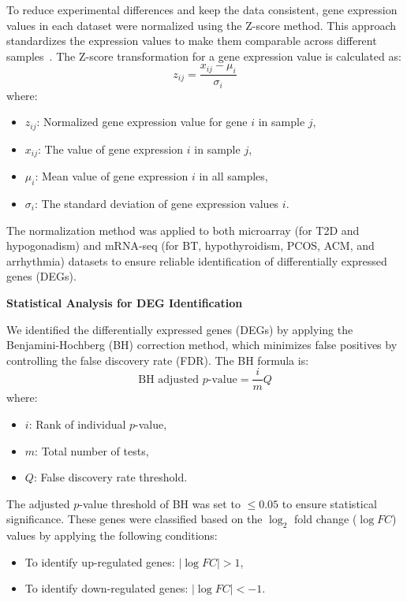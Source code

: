 To reduce experimental differences and keep the data consistent, gene expression values in each dataset were normalized using the Z-score method. This approach standardizes the expression values to make them comparable across different samples~\cite{b15}. The Z-score transformation for a gene expression value is calculated as:
\begin{equation}
z_{ij} = \frac{x_{ij} - \mu_i}{\sigma_i}
\label{eq:zscore}
\end{equation}
where:
\begin{itemize}
    \item $z_{ij}$: Normalized gene expression value for gene $i$ in sample $j$,
    \item $x_{ij}$: The value of gene expression $i$ in sample $j$,
    \item $\mu_i$: Mean value of gene expression $i$ in all samples,
    \item $\sigma_i$: The standard deviation of gene expression values $i$.
\end{itemize}

The normalization method was applied to both microarray (for T2D and hypogonadism) and mRNA-seq (for BT, hypothyroidism, PCOS, ACM, and arrhythmia) datasets to ensure reliable identification of differentially expressed genes (DEGs).

\vspace{8mm}
\textbf{Statistical Analysis for DEG Identification}
\vspace{5mm}

We identified the differentially expressed genes (DEGs) by applying the Benjamini-Hochberg (BH) correction method, which minimizes false positives by controlling the false discovery rate (FDR). The BH formula is:
\begin{equation}
\text{BH adjusted } p\text{-value} = \frac{i}{m} Q
\label{eq:bh_formula}
\end{equation}
where:
\begin{itemize}
    \item $i$: Rank of individual $p$-value,
    \item $m$: Total number of tests,
    \item $Q$: False discovery rate threshold.
\end{itemize}

The adjusted $p$-value threshold of BH was set to $\leq 0.05$ to ensure statistical significance. These genes were classified based on the $\log_2$ fold change ($\log FC$) values by applying the following conditions:
\begin{itemize}
    \item To identify up-regulated genes: $\left| \log FC \right| > 1$,
    \item To identify down-regulated genes: $\left| \log FC \right| < -1$.
\end{itemize}

